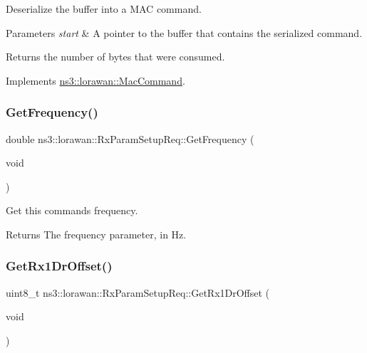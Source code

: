 Deserialize the buffer into a M\+AC command.


\begin{DoxyParams}{Parameters}
{\em start} & A pointer to the buffer that contains the serialized command. \\
\hline
\end{DoxyParams}
\begin{DoxyReturn}{Returns}
the number of bytes that were consumed. 
\end{DoxyReturn}


Implements \hyperlink{classns3_1_1lorawan_1_1MacCommand_af12d223a71a67196bce498f1240eda75}{ns3\+::lorawan\+::\+Mac\+Command}.

\mbox{\label{classns3_1_1lorawan_1_1RxParamSetupReq_aeb4c2b794d0afa15797ce99c1543609a}} 
\subsubsection{\texorpdfstring{Get\+Frequency()}{GetFrequency()}}
{\footnotesize\ttfamily double ns3\+::lorawan\+::\+Rx\+Param\+Setup\+Req\+::\+Get\+Frequency (\begin{DoxyParamCaption}\item[{void}]{ }\end{DoxyParamCaption})}

Get this command\textquotesingle{}s frequency.

\begin{DoxyReturn}{Returns}
The frequency parameter, in Hz. 
\end{DoxyReturn}
\mbox{\label{classns3_1_1lorawan_1_1RxParamSetupReq_a3b1dead7733bc5b47cecbd1b5a673f82}} 
\subsubsection{\texorpdfstring{Get\+Rx1\+Dr\+Offset()}{GetRx1DrOffset()}}
{\footnotesize\ttfamily uint8\+\_\+t ns3\+::lorawan\+::\+Rx\+Param\+Setup\+Req\+::\+Get\+Rx1\+Dr\+Offset (\begin{DoxyParamCaption}\item[{void}]{ }\end{DoxyParamCaption})}

